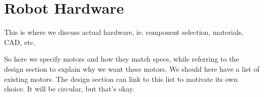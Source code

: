 \section{Robot Hardware}

This is where we discuss actual hardware, ie. component selection, materials, CAD, etc. 

So here we specify motors and how they match specs, while referring to the design section to explain why we want these motors. We should here have a list of existing motors. The design section can link to this list to motivate its own choice. It will be circular, but that's okay. 